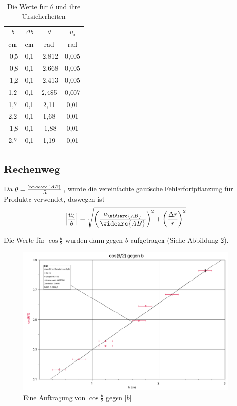 \documentclass[11pt,a4paper]{article}
\begin{document}
\begin{table}[h]
	\centering
	\begin{tabular*}{0.50\textwidth}{@{\extracolsep{\fill}}cccc}
		\toprule
		$b$ & $\Delta b$ & $\theta$ & $u_\theta$  \\
		cm & cm & rad & rad \\
		\midrule
		-0,5 & 0,1 & -2,812 & 0,005\\
		-0,8 & 0,1  &-2,668& 0,005\\
		-1,2 & 0,1  &-2,413& 0,005\\
		1,2 & 0,1 &2,485& 0,007\\
		1,7 & 0,1  &2,11& 0,01\\
		2,2 & 0,1  &1,68& 0,01\\
		-1,8 & 0,1  &-1,88& 0,01\\
		2,7 & 0,1  &1,19& 0,01\\
		\bottomrule
	\end{tabular*}
\caption{Die Werte für $\theta$ und ihre Unsicherheiten}
\end{table}

\begin{tcolorbox}[colback=white]
\subsection{Rechenweg}
Da $\theta = \frac{\widearc{AB}}{R}$, wurde die vereinfachte gaußsche Fehlerfortpflanzung für Produkte verwendet, deswegen ist
$$ \left|\frac{u_\theta}{\theta}\right| = \sqrt{\left(\frac{u_{\widearc{AB}}}{\widearc{AB}}\right)^2+\left(\frac{\Delta r}{r}\right)^2}$$
\end{tcolorbox}

Die Werte für $\cos{\frac{\theta}{2}}$ wurden dann gegen $b$ aufgetragen (Siehe Abbildung 2). 
\begin{figure}[h]
	\centering
	\includegraphics[width=\linewidth]{Abb2}
	\caption{Eine Auftragung von $\cos{\frac{\theta}{2}}$ gegen $|b|$}
\end{figure}
\end{document}
